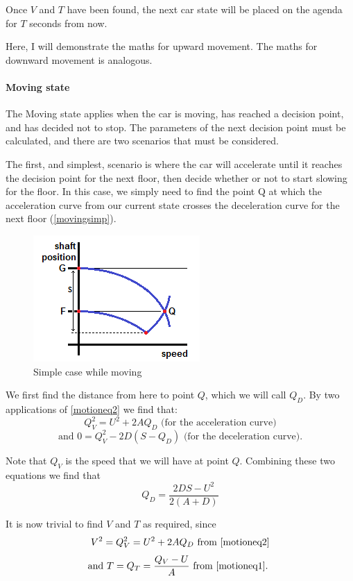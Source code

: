 \documentclass{UoYCSproject}
\begin{document}
Once $V$ and $T$ have been found, the next car state will be placed on the agenda for $T$ seconds from now.

Here, I will demonstrate the maths for upward movement.  The maths for downward movement is analogous.

\paragraph{Moving state}

The Moving state applies when the car is moving, has reached a decision point, and has decided not to stop.  The parameters of the next decision point must be calculated, and there are two scenarios that must be considered.

The first, and simplest, scenario is where the car will accelerate until it reaches the decision point for the next floor, then decide whether or not to start slowing for the floor.  In this case, we simply need to find the point Q at which the acceleration curve from our current state crosses the deceleration curve for the next floor (\autoref{movingsimp}).

\begin{figure} [h]
	\centering
	\includegraphics{moving_simp.png}
	\caption{Simple case while moving}
	\label{movingsimp}
\end{figure}

We first find the distance from here to point $Q$, which we will call $Q_D$.  By two applications of \autoref{motioneq2} we find that:
\[Q_V^2=U^2+2AQ_D \text{ (for the acceleration curve)}\]
\[ \text{and } 0=Q_V^2-2D(S-Q_D) \text{ (for the deceleration curve).} \]

Note that $Q_V$ is the speed that we will have at point $Q$.  Combining these two equations we find that
\[ Q_D=\frac{2DS-U^2}{2(A+D)} \]

It is now trivial to find $V$ and $T$ as required, since
\[ V^2=Q_V^2=U^2+2AQ_D \text{ from \autoref{motioneq2}} \]
\[ \text{and } T=Q_T=\frac{Q_V-U}{A} \text{ from \autoref{motioneq1}. } \]
\end{document}
